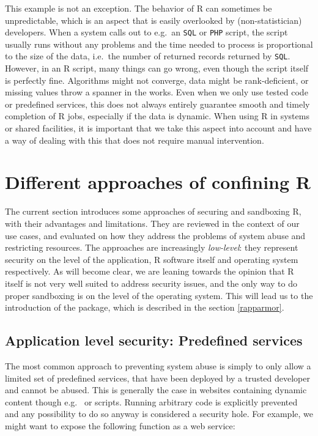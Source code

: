\documentclass[article]{jss}
\newcommand{\R}{\textsf{R}\xspace}
\newcommand{\RAppArmor}{\pkg{RAppArmor}\xspace}
\begin{document}
This example is not an exception. The behavior of \R can sometimes be
unpredictable, which is an aspect that is easily overlooked by
(non-statistician) developers. When a system calls out to e.g.\ an \texttt{SQL}
or \texttt{PHP} script, the script usually runs without any problems and the
time needed to process is proportional to the size of the data, i.e.\ the number
of returned records returned by \texttt{SQL}. However, in an \R
script, many things can go wrong, even though the script itself is perfectly
fine. Algorithms might not converge, data might be rank-deficient, or missing
values throw a spanner in the works. Even when we only use tested code or
predefined services, this does not always entirely guarantee smooth and timely
completion of \R jobs, especially if the data is dynamic. When using
\R in systems or shared facilities, it is important that we take this
aspect into account and have a way of dealing with this that does not require
manual intervention.

\section[Different approaches of confining R]{Different approaches of confining
\R}

The current section introduces some approaches of securing and sandboxing
\R, with their advantages and limitations. They are reviewed in the
context of our use cases, and evaluated on how they address the problems of
system abuse and restricting resources. The approaches are increasingly
\emph{low-level}: they represent security on the level of the application, R
software itself and operating system respectively. As will become clear, we are
leaning towards the opinion that \R itself is not very well suited to address security issues, and the only way to do proper sandboxing is on the level of the
operating system. This will lead us to the introduction of the \RAppArmor
package, which is described in the section \ref{rapparmor}.


\subsection{Application level security: Predefined services}

The most common approach to preventing system abuse is simply to only allow a
limited set of predefined services, that have been deployed by a trusted
developer and cannot be abused. This is generally the case in websites
containing dynamic content though e.g.\  or  scripts.
Running arbitrary code is explicitly prevented and any possibility to do so
anyway is considered a security hole. For example, we might want to expose the
following function as a web service:
\end{document}

